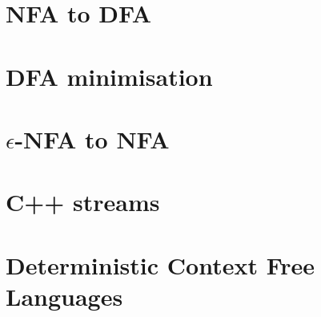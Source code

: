 \documentclass[a4paper,12pt]{article}
\begin{document}
\section{NFA to DFA}

\section{DFA minimisation}

\section{\(\epsilon\)-NFA to NFA}
\section{C++ streams}
\section{Deterministic Context Free Languages}
\end{document}
